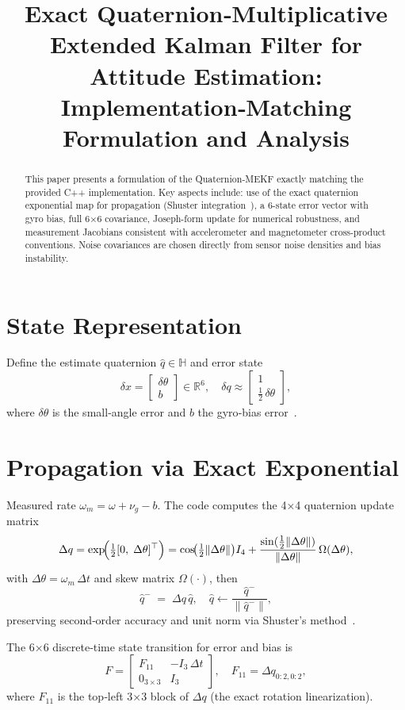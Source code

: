 \documentclass[12pt,letterpaper]{article}
\title{Exact Quaternion‐Multiplicative Extended Kalman Filter for Attitude Estimation:\\
Implementation‐Matching Formulation and Analysis}
\author{}
\date{}
\begin{document}
\maketitle

\begin{abstract}
This paper presents a formulation of the Quaternion‐MEKF exactly matching the provided C++ implementation.  Key aspects include: use of the exact quaternion exponential map for propagation (Shuster integration~\cite{Shuster1981}), a 6-state error vector with gyro bias, full 6×6 covariance, Joseph-form update for numerical robustness, and measurement Jacobians consistent with accelerometer and magnetometer cross-product conventions.  Noise covariances are chosen directly from sensor noise densities and bias instability.
\end{abstract}

\section{State Representation}
Define the estimate quaternion $\hat q\in\mathbb H$ and error state
\[
\delta x = \begin{bmatrix}\delta\theta\\ b\end{bmatrix}\in\mathbb R^6,
\quad \delta q \approx \begin{bmatrix}1\\ \tfrac12\,\delta\theta\end{bmatrix}, 
\]
where $\delta\theta$ is the small‐angle error and $b$ the gyro‐bias error~\cite{Lefferts1982,Markley2003}.

\section{Propagation via Exact Exponential}
Measured rate $\omega_m=\omega+\nu_g - b$.  The code computes the 4×4 quaternion update matrix
\[
\Delta q = \exp\!\Bigl(\tfrac12 [0,\;\Delta\theta]^\top\Bigr)
= \cos\!\bigl(\tfrac12\|\Delta\theta\|\bigr)I_4
+ \frac{\sin(\tfrac12\|\Delta\theta\|)}{\|\Delta\theta\|}\,\Omega(\Delta\theta),
\]
with $\Delta\theta=\omega_m\,\Delta t$ and skew matrix $\Omega(\cdot)$, then
\[
\hat q^-\;=\;\Delta q\,\hat q,
\quad
\hat q\leftarrow\frac{\hat q^-}{\|\hat q^-\|},
\]
preserving second‐order accuracy and unit norm via Shuster’s method~\cite{Shuster1981}.

The 6×6 discrete‐time state transition for error and bias is
\[
F = 
\begin{bmatrix}
F_{11} & -I_3\,\Delta t\\
0_{3\times3} & I_3
\end{bmatrix}, 
\quad
F_{11} = \Delta q_{0:2,0:2},
\]
where $F_{11}$ is the top‐left 3×3 block of $\Delta q$ (the exact rotation linearization).
\end{document}
